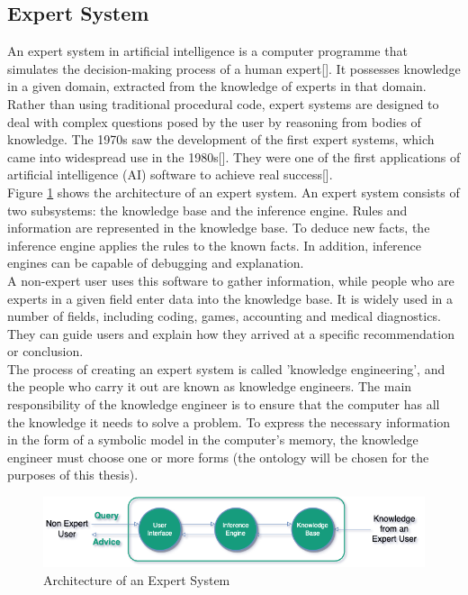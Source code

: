 \subsection{Expert System\label{subsec:exp-sys}}
An expert system in artificial intelligence is a computer programme that simulates the decision-making process of a human expert[]. It possesses knowledge in a given domain, extracted from the knowledge of experts in that domain.  Rather than using traditional procedural code, expert systems are designed to deal with complex questions posed by the user by reasoning from bodies of knowledge. The 1970s saw the development of the first expert systems, which came into widespread use in the 1980s[]. They were one of the first applications of artificial intelligence (AI) software to achieve real success[]. \\

Figure \ref{fig:es-archi} shows the architecture of an expert system. An expert system consists of two subsystems: the knowledge base and the inference engine. Rules and information are represented in the knowledge base. To deduce new facts, the inference engine applies the rules to the known facts. In addition, inference engines can be capable of debugging and explanation.\\

A non-expert user uses this software to gather information, while people who are experts in a given field enter data into the knowledge base. It is widely used in a number of fields, including coding, games, accounting and medical diagnostics. They can guide users and explain how they arrived at a specific recommendation or conclusion.\\

The process of creating an expert system is called 'knowledge engineering', and the people who carry it out are known as knowledge engineers. The main responsibility of the knowledge engineer is to ensure that the computer has all the knowledge it needs to solve a problem. To express the necessary information in the form of a symbolic model in the computer's memory, the knowledge engineer must choose one or more forms (the ontology will be chosen for the purposes of this thesis).\\

\begin{figure}[H]
    \centering
    \includegraphics[scale=0.6]{images/Foundation-Architecture_Expert_System.drawio.png}
    \caption{\label{fig:es-archi} Architecture of an Expert System }
\end{figure}

